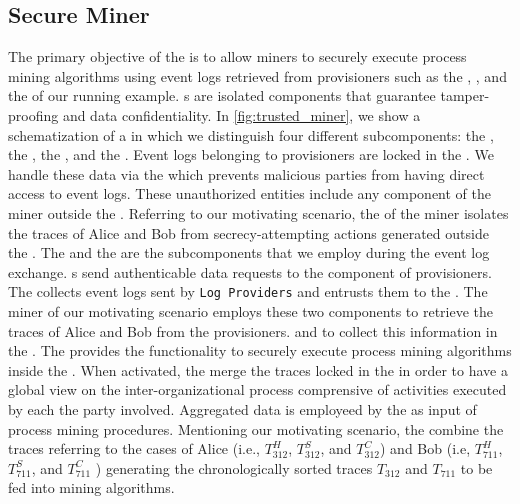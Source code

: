 \subsection{Secure Miner}
The primary objective of the  is to allow miners to securely execute process mining algorithms using event logs retrieved from provisioners such as the , , and the  of our running example. s are isolated components that guarantee tamper-proofing and data confidentiality. In \cref{fig:trusted_miner}, we show a schematization of a  in which we distinguish four different subcomponents: the , the , the , and the . Event logs belonging to provisioners are locked in the .
We handle these data via the  which prevents malicious parties from having direct access to event logs. These unauthorized entities include any component of the miner  outside the . Referring to our motivating scenario, the  of the miner isolates the traces of Alice and Bob from secrecy-attempting actions generated outside the . %
The  and the  are the subcomponents that we employ during the event log exchange. s send authenticable data requests to the  component of provisioners. The  collects event logs sent by \texttt{Log Providers} and entrusts them to the . The miner of our motivating scenario employs these two components to retrieve the traces of Alice and Bob from the provisioners. %
and to collect this information in the . The  provides the functionality to securely execute process mining algorithms inside the . When activated, the  merge the traces locked in the  in order to have a global view on the inter-organizational process comprensive of activities executed by each the party involved. Aggregated data is employeed by the  as input of process mining procedures. Mentioning our motivating scenario, the  combine the traces referring to the cases of Alice (i.e., $T^H_{312}$, $T^S_{312}$, and $T^C_{312}$) and Bob (i.e, $T^H_{711}$, $T^S_{711}$, and $T^C_{711}$ ) generating the chronologically sorted traces $T_{312}$ and $T_{711}$ to be fed into mining algorithms.  %



